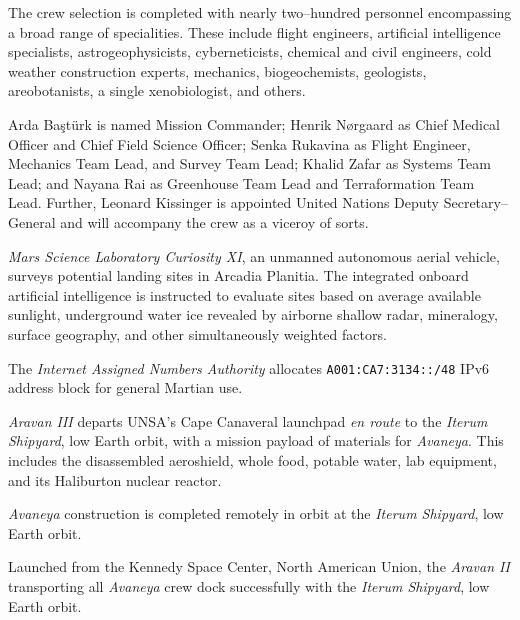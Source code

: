 The crew selection is completed with nearly two--hundred personnel encompassing a broad range of specialities. These include flight engineers, artificial intelligence specialists, astrogeophysicists, cyberneticists, chemical and civil engineers, cold weather construction experts, mechanics, biogeochemists, geologists, areobotanists, a single xenobiologist, and others.

Arda Baştürk is named Mission Commander; Henrik Nørgaard as Chief Medical Officer and Chief Field Science Officer; Senka Rukavina as Flight Engineer, Mechanics Team Lead, and Survey Team Lead; Khalid Zafar as Systems Team Lead; and Nayana Rai as Greenhouse Team Lead and Terraformation Team Lead. Further, Leonard Kissinger is appointed United Nations Deputy Secretary--General and will accompany the crew as a viceroy of sorts.
\StopTimelineDate

{\it Mars Science Laboratory Curiosity XI}, an unmanned autonomous aerial vehicle, surveys potential landing sites in Arcadia Planitia. The integrated onboard artificial intelligence is instructed to evaluate sites based on average available sunlight, underground water ice revealed by airborne shallow radar, mineralogy, surface geography, and other simultaneously weighted factors.
\StopTimelineDate

The {\it Internet Assigned Numbers Authority} allocates {\tt A001:CA7:3134::/48} IPv6 address block for general Martian use. 
\StopTimelineDate

{\it Aravan III} departs UNSA's Cape Canaveral launchpad {\it en route} to the {\it Iterum Shipyard}, low Earth orbit, with a mission payload of materials for {\it Avaneya}. This includes the disassembled aeroshield, whole food, potable water, lab equipment, and its Haliburton nuclear reactor.
\StopTimelineDate

{\it Avaneya} construction is completed remotely in orbit at the {\it Iterum Shipyard}, low Earth orbit.
\StopTimelineDate

Launched from the Kennedy Space Center, North American Union, the {\it Aravan II} transporting all {\it Avaneya} crew dock successfully with the {\it Iterum Shipyard}, low Earth orbit.
\StopTimelineDate

